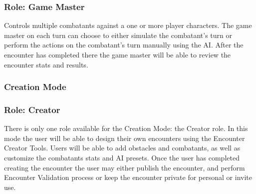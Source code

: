 \documentclass[12pt,a4paper]{report}
\begin{document}
	\subsubsection{Role: Game Master}
	Controls multiple combatants against a one or more player characters. The game master on each turn can choose to either simulate the combatant's turn or perform the actions on the combatant's turn manually using the AI. After the encounter has completed there the game master will be able to review the encounter stats and results.
	
	\subsubsection{Creation Mode}
	\subsubsection{Role: Creator}
	There is only one role available for the Creation Mode: the Creator role. In this mode the user will be able to design their own encounters using the Encounter Creator Tools. Users will be able to add obstacles and combatants, as well as customize the combatants stats and AI presets. Once the user has completed creating the encounter the user may either publish the encounter, and perform Encounter Validation process or keep the encounter private for personal or invite use.
	
	\newpage
\end{document}
